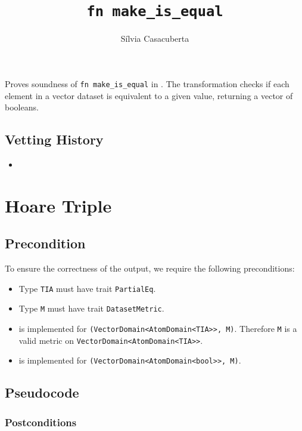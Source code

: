 \documentclass{article}
\title{\texttt{fn make\_is\_equal}}
\author{S\'ilvia Casacuberta}
\date{}
\begin{document}
\maketitle

\contrib
Proves soundness of \texttt{fn make\_is\_equal} in .
The transformation checks if each element in a vector dataset is equivalent to a given value,
returning a vector of booleans.

\subsection*{Vetting History}
\begin{itemize}
    \item {}
\end{itemize}

\section{Hoare Triple}
\subsection*{Precondition}
To ensure the correctness of the output, we require the following preconditions:

\begin{itemize}
    \item Type \texttt{TIA} must have trait \texttt{PartialEq}.
    \item Type \texttt{M} must have trait \texttt{DatasetMetric}.
    \item {} is implemented for \texttt{(VectorDomain<AtomDomain<TIA>{}>, M)}. Therefore \texttt{M} is a valid metric on \texttt{VectorDomain<AtomDomain<TIA>{}>}.
    \item {} is implemented for \texttt{(VectorDomain<AtomDomain<bool>{}>, M)}.
\end{itemize}

\subsection*{Pseudocode}


\subsubsection*{Postconditions}
\end{document}
